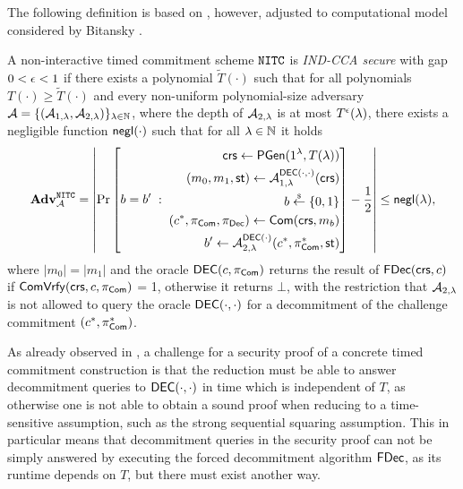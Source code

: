 The following definition is based on \cite{TCC:KatLosXu20}, however, adjusted to computational model considered by Bitansky \etal \cite{ITCS:BGJPVW16}. 
\begin{definition}
\label{def:nitc_cca}
A non-interactive timed commitment scheme $\mathtt{NITC}$ is \emph{IND-CCA secure} with gap $0 < \epsilon < 1$ if there exists a polynomial $\tilde{T}(\cdot)$ such that for all polynomials $T(\cdot) \geq \tilde{T}(\cdot)$ and every non-uniform polynomial-size adversary $\mathcal{A} = \{(\mathcal{A}_{1,\lambda}, \mathcal{A}_{2, \lambda})\}_{\lambda \in \mathbb{N}}$, where the depth of $\mathcal{A}_{2, \lambda}$ is at most $T^{\epsilon}(\lambda)$, there exists a negligible function $\mathsf{negl}(\cdot)$ such that for all $\lambda \in \mathbb{N}$ it holds 
\[ \mathbf{Adv}^{\mathtt{NITC}}_{\mathcal{A}} = 
\left| \Pr\left[ 
    b = b'
    \;:\;
    \begin{aligned}
    \mathsf{crs} \leftarrow \mathsf{PGen}(1{^{\lambda}}, T(\lambda)) \\
      (m_0, m_1, \mathsf{st}) \leftarrow \mathcal{A}_{1,\lambda}^{\mathsf{DEC}(\cdot, \cdot)}(\mathsf{crs}) \\
      b \stackrel{{\scriptscriptstyle\$}}{\leftarrow} \{0,1\}\\
      (c^*, \pi_{\mathsf{Com}}, \pi_{\mathsf{Dec}}) \leftarrow \mathsf{Com}(\mathsf{crs}, m_b) \\
      b' \leftarrow \mathcal{A}_{2,\lambda}^{\mathsf{DEC}(\cdot)}(c^*, \pi_{\mathsf{Com}}^*, \mathsf{st})
    \end{aligned}
    \right] -  \frac{1}{2} \right|
\leq \mathsf{negl}(\lambda),  
\]
where $|m_0|=|m_1|$ and the oracle ${\mathsf{DEC}(c, \pi_{\mathsf{Com}})}$ returns the result of $\mathsf{FDec}(\mathsf{crs}, c)$ if $\mathsf{ComVrfy}(\mathsf{crs},c,\pi_{\mathsf{Com}})$ = 1, otherwise it returns $\bot$, with the restriction that $\mathcal{A}_{2, \lambda}$ is not allowed to query the oracle $\mathsf{DEC}(\cdot, \cdot)$ for a decommitment of the challenge commitment $(c^*, \pi_{\mathsf{Com}}^*)$. %
\end{definition}

As already observed in \cite{TCC:KatLosXu20}, a challenge for a security proof of a concrete timed commitment construction is that the reduction must be able to answer decommitment queries to $\mathsf{DEC}(\cdot,\cdot)$ in time which is independent of $T$, as otherwise one is not able to obtain a sound proof when reducing to a time-sensitive assumption, such as the strong sequential squaring assumption. This in particular means that decommitment queries in the security proof can not be simply answered by executing the forced decommitment algorithm $\mathsf{FDec}$, as its runtime depends on $T$, but there must exist another way.  %

